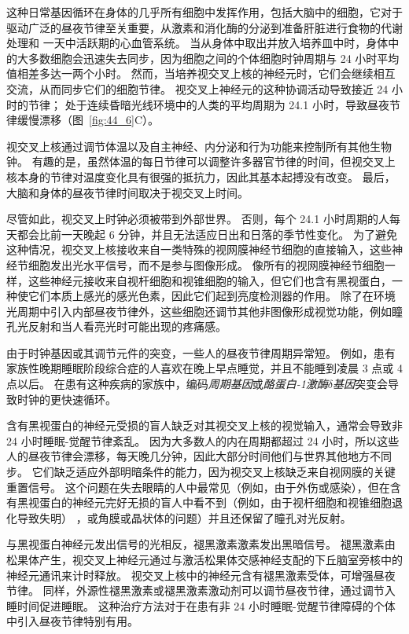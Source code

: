 这种日常基因循环在身体的几乎所有细胞中发挥作用，包括大脑中的细胞，它对于驱动广泛的昼夜节律至关重要，从激素和消化酶的分泌到准备肝脏进行食物的代谢处理和 一天中活跃期的心血管系统。
当从身体中取出并放入培养皿中时，身体中的大多数细胞会迅速失去同步，因为细胞之间的个体细胞时钟周期与 24 小时平均值相差多达一两个小时。
然而，当培养视交叉上核的神经元时，它们会继续相互交流，从而同步它们的细胞节律。
视交叉上神经元的这种协调活动导致接近 24 小时的节律；
处于连续昏暗光线环境中的人类的平均周期为 24.1 小时，导致昼夜节律缓慢漂移（图~\ref{fig:44_6}C）。


视交叉上核通过调节体温以及自主神经、内分泌和行为功能来控制所有其他生物钟。
有趣的是，虽然体温的每日节律可以调整许多器官节律的时间，但视交叉上核本身的节律对温度变化具有很强的抵抗力，因此其基本起搏没有改变。
最后，大脑和身体的昼夜节律时间取决于视交叉上时间。


尽管如此，视交叉上时钟必须被带到外部世界。
否则，每个 24.1 小时周期的人每天都会比前一天晚起 6 分钟，并且无法适应日出和日落的季节性变化。
为了避免这种情况，视交叉上核接收来自一类特殊的视网膜神经节细胞的直接输入，这些神经节细胞发出光水平信号，而不是参与图像形成。
像所有的视网膜神经节细胞一样，这些神经元接收来自视杆细胞和视锥细胞的输入，但它们也含有黑视蛋白，一种使它们本质上感光的感光色素，因此它们起到亮度检测器的作用。
除了在环境光周期中引入内部昼夜节律外，这些细胞还调节其他非图像形成视觉功能，例如瞳孔光反射和当人看亮光时可能出现的疼痛感。


由于时钟基因或其调节元件的突变，一些人的昼夜节律周期异常短。
例如，患有家族性晚期睡眠阶段综合症的人喜欢在晚上早点睡觉，并且不能睡到凌晨 3 点或 4 点以后。
在患有这种疾病的家族中，编码\textit{周期基因}或\textit{酪蛋白-1激酶$\delta$基因}突变会导致时钟的更快速循环。


含有黑视蛋白的神经元受损的盲人缺乏对其视交叉上核的视觉输入，通常会导致非 24 小时睡眠-觉醒节律紊乱。
因为大多数人的内在周期都超过 24 小时，所以这些人的昼夜节律会漂移，每天晚几分钟，因此大部分时间他们与世界其他地方不同步。
它们缺乏适应外部明暗条件的能力，因为视交叉上核缺乏来自视网膜的关键重置信号。
这个问题在失去眼睛的人中最常见（例如，由于外伤或感染），但在含有黑视蛋白的神经元完好无损的盲人中看不到（例如，由于视杆细胞和视锥细胞退化导致失明） ，或角膜或晶状体的问题）并且还保留了瞳孔对光反射。


与黑视蛋白神经元发出信号的光相反，褪黑激素激素发出黑暗信号。
褪黑激素由松果体产生，视交叉上神经元通过与激活松果体交感神经支配的下丘脑室旁核中的神经元通讯来计时释放。
视交叉上核中的神经元含有褪黑激素受体，可增强昼夜节律。
同样，外源性褪黑激素或褪黑激素激动剂可以调节昼夜节律，通过调节入睡时间促进睡眠。
这种治疗方法对于在患有非 24 小时睡眠-觉醒节律障碍的个体中引入昼夜节律特别有用。



